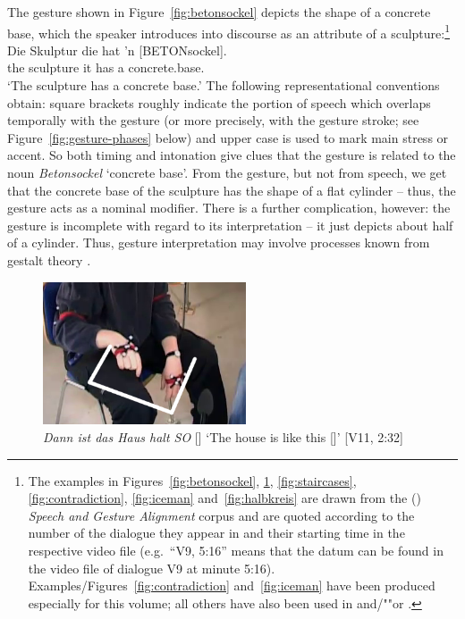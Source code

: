 \documentclass[output=paper,biblatex,babelshorthands,newtxmath,draftmode,colorlinks,citecolor=brown]{langscibook}
\begin{document}
The gesture shown in Figure~\ref{fig:betonsockel} depicts the shape of a concrete base, which the speaker introduces into discourse as an attribute of a sculpture:\footnote{The examples in Figures~\ref{fig:betonsockel}, \ref{fig:so}, \ref{fig:staircases}, \ref{fig:contradiction}, \ref{fig:iceman} and~\ref{fig:halbkreis} are drawn from the () \emph{Speech and Gesture Alignment} corpus \citep[,][]{Luecking:Bergmann:Hahn:Kopp:Rieser:2010} and are quoted according to the number of the dialogue they appear in and their starting time in the respective video file (e.g.\ \enquote{V9, 5:16} means that the datum can be found in the video file of dialogue V9 at minute 5:16). Examples/Figures~\ref{fig:contradiction} and~\ref{fig:iceman} have been produced especially for this volume; all others have also been used in \citet{Luecking:2013:a} and/""or \citet{Luecking:2016}.}
%
\ea \label{ex:betonsockel}
\gll Die Skulptur die hat 'n [BETONsockel]. \\
     the sculpture it has a concrete.base. \\
\glt \enquote*{The sculpture has a concrete base.}
\z
%
The following representational conventions obtain: square brackets roughly indicate the portion of speech which overlaps temporally with the gesture (or more precisely, with the gesture stroke; see Figure~\ref{fig:gesture-phases} below) and upper case is used to mark main stress or accent.
%
So both timing and intonation give clues that the gesture is related to the noun \emph{Betonsockel} `concrete base'.
%
From the gesture, but not from speech, we get that the concrete base of the sculpture has the shape of a flat cylinder -- thus, the gesture acts as a nominal modifier.
%
There is a further complication, however: the gesture is incomplete with regard to its interpretation -- it just depicts about half of a cylinder. 
%
Thus, gesture interpretation may involve processes known from gestalt theory \citetext{see \citealp{Luecking:2016} on a \emph{good continuation} constraint relevant to (\ref{ex:betonsockel})/Figure~\ref{fig:betonsockel}}.


\begin{figure}
  \centering
  \includegraphics[width=6cm]{figures/mmsubcat2-path}
  \caption[Like this]{\textit{Dann ist das Haus halt SO} [] \enquote*{The house is like this []} [V11, 2:32]}
  \label{fig:so}
\end{figure}
\end{document}
